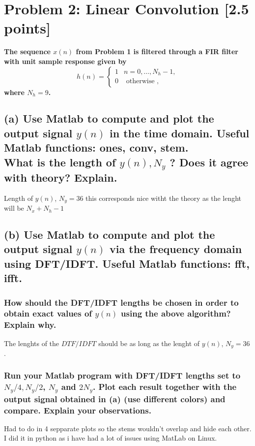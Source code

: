 \section{Problem 2: Linear Convolution [2.5 points]}
\textbf{The sequence $x(n)$ from Problem 1 is filtered through a FIR filter with unit sample response given by}
$$
h(n)= \begin{cases}1 & n=0, \ldots, N_h-1, \\ 0 & \text { otherwise },\end{cases}
$$
\textbf{where $N_h=9$.}
\subsection*{(a) Use Matlab to compute and plot the output signal $y(n)$ in the time domain. Useful Matlab functions: ones, conv, stem. \\What is the length of $y(n), N_y$ ? Does it agree with theory? Explain.}
Length of $y(n)$, $N_y = 36$ this corresponds nice witht the theory as the lenght will be $N_x+N_h-1$


\subsection*{(b) Use Matlab to compute and plot the output signal $y(n)$ via the frequency domain using DFT/IDFT. Useful Matlab functions: fft, ifft.}

\subsubsection*{How should the DFT/IDFT lengths be chosen in order to obtain exact values of $y(n)$ using the above algorithm? Explain why.}
The lenghts of the $DTF/IDFT$ should be as long as the lenght of $y(n)$, $N_y = 36$.
\subsubsection*{Run your Matlab program with DFT/IDFT lengths set to $N_y / 4, N_y / 2$, $N_y$ and $2 N_y$. Plot each result together with the output signal obtained in (a) (use different colors) and compare. Explain your observations.}


Had to do in 4 sepparate plots so the stems wouldn't overlap and hide each other. I did it in python as i have had a lot of issues using MatLab on Linux.